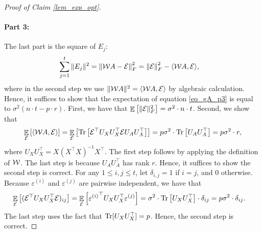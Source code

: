\begin{proof}[Proof of Claim \ref{lem_exp_opt}]
	\paragraph{Part 3:} The last part is the square of $E_j$:
	\begin{align}\label{eq_gA_p3}
		\sum_{j=1}^t \|E_j\|^2 &= \left\| {\mathcal W} A - \mathcal{E} \right\|_{F}^2
		= \left\| \mathcal{E} \right\|_{F}^2 - \langle {\mathcal W} A, \mathcal{E} \rangle,
	\end{align}
	where in the second step we use $\|{\mathcal W} A\|^2 = \langle {\mathcal W} A, \mathcal{E} \rangle$ by algebraic calculation.
	Hence, it suffices to show that the expectation of equation \eqref{eq_gA_p3} is equal to $\sigma^2 (n\cdot t - p\cdot r)$.
	First, we have that $\mathop{\mathbb{E}}\left[ \|\mathcal{E}\|_F^2 \right] = \sigma^2 \cdot n \cdot t$.
	Second, we show that
	\begin{align*}
		\mathop{\mathbb{E}}_{\mathcal{E}}\left[  \langle {\mathcal W} A, \mathcal{E} \rangle \right] =\mathop{\mathbb{E}}_{\mathcal{E}}\left[ \operatorname{Tr}\left[\mathcal E^\top U_X U_X^\top \mathcal E U_AU_A^\top\right]  \right]= p\sigma^2 \cdot \operatorname{Tr}\left[ U_AU_A^\top\right] =  p \sigma^2 \cdot r,
	\end{align*}
	where $U_XU_X^\top = X(X^{\top} X)^{-1} X^{\top}$.
	The first step follows by applying the definition of ${\mathcal W}$.
	The last step is because $U_AU_A^\top$ has rank $r$.
	Hence, it suffices to show the second step is correct.
	For any $1\le i, j \le t$, let $\delta_{i, j} = 1$ if $i = j$, and $0$ otherwise.
	Because $\varepsilon^{(i)}$ and $\varepsilon^{(j)}$ are pairwise independent, we have that
	\begin{align*}
			 \mathop{\mathbb{E}}_{\mathcal{E}}\left[ (\mathcal{E}^{\top}U_XU_X^\top \mathcal{E})_{ij}  \right]
		&= \mathop{\mathbb{E}}_{\mathcal{E}}\left[ {\varepsilon^{(i)}}^\top U_X U_X^\top  \varepsilon^{(j)}  \right] = \sigma^2 \cdot \operatorname{Tr}\left[U_XU_X^\top \right] \cdot \delta_{ij} = p\sigma^2 \cdot \delta_{ij}.
	\end{align*}
	The last step uses the fact that $\operatorname{Tr}[U_XU_X^\top] = p$.
	Hence, the second step is correct.


\end{proof}
